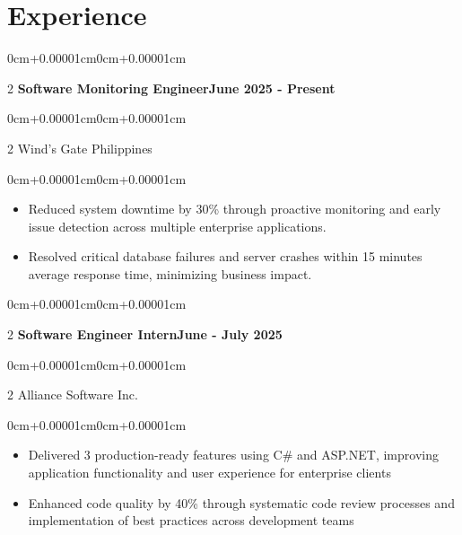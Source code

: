 \documentclass[11pt, letterpaper]{article}
\newenvironment{highlights}{\begin{itemize}[topsep=0.08cm,parsep=0.08cm,partopsep=0pt,itemsep=0pt,leftmargin=0cm+10pt]}{\end{itemize}}
\newenvironment{onecolentry}{\begin{adjustwidth}{0cm+0.00001cm}{0cm+0.00001cm}}{\end{adjustwidth}}
\newenvironment{twocolentry}[2][]{\onecolentry\def\secondColumn{#2}\setcolumnwidth{\fill,5.2cm}\begin{paracol}{2}}{\switchcolumn \raggedleft \secondColumn\end{paracol}\endonecolentry}
\begin{document}
\section{Experience}

    \begin{twocolentry}{\textbf{June 2025 - Present}}
    \textbf{Software Monitoring Engineer}\end{twocolentry}
    \vspace{0.05cm}
    \begin{twocolentry}{}
    Wind's Gate Philippines\end{twocolentry}
    \vspace{0.10cm}
    \begin{onecolentry}
        \begin{highlights}
            \item Reduced system downtime by 30\% through proactive monitoring and early issue detection across multiple enterprise applications.
            \item Resolved critical database failures and server crashes within 15 minutes average response time, minimizing business impact.
        \end{highlights}
    \end{onecolentry}
    \vspace{0.15cm}

    \begin{twocolentry}{\textbf{June - July 2025}}
    \textbf{Software Engineer Intern}\end{twocolentry}
    \vspace{0.05cm}
    \begin{twocolentry}{}
    Alliance Software Inc.\end{twocolentry}
    \vspace{0.10cm}
    \begin{onecolentry}
        \begin{highlights}
            \item Delivered 3 production-ready features using C\# and ASP.NET, improving application functionality and user experience for enterprise clients
            \item Enhanced code quality by 40\% through systematic code review processes and implementation of best practices across development teams
        \end{highlights}
    \end{onecolentry}
    \vspace{0.15cm}
\end{document}
